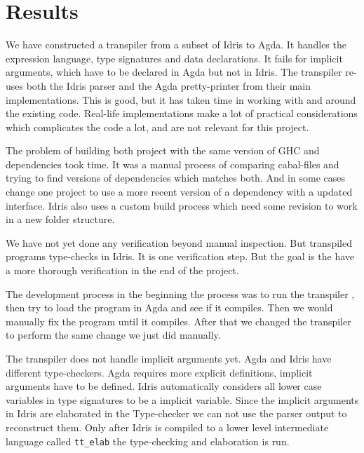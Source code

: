 \documentclass[parskip=half]{scrartcl}
\begin{document}
\section{Results}

We have constructed a transpiler from a subset of Idris to Agda. It handles the
expression language, type signatures and data declarations.  It fails for
implicit arguments, which have to be declared in Agda but not in Idris. The
transpiler re-uses both the Idris parser and the Agda pretty-printer from their
main implementations.  This is good, but it has taken time in working with and
around the existing code.  Real-life implementations make a lot of practical
considerations which complicates the code a lot, and are not relevant for this
project.


The problem of building both project with the same version of GHC and
dependencies took time. It was a manual process of comparing cabal-files and
trying to find versions of dependencies which matches both. And in some cases
change one project to use a more recent version of a dependency with a updated
interface. Idris also uses a custom build process which need some revision to
work in a new folder structure.



We have not yet done any verification beyond manual inspection.  But transpiled
programs type-checks in Idris. It is one verification step.  But the goal is
the have a more thorough verification in the end of the project.

The development process in the beginning the process was to run the transpiler , then try to load the program in Agda and see if it compiles.
Then we would manually fix the program until it compiles.
After that we changed the transpiler to perform the same change we just did
manually.


The transpiler does not handle implicit arguments yet.
Agda and Idris have different type-checkers.
Agda requires more explicit definitions, implicit arguments have to be defined.
Idris automatically considers all lower case variables in type signatures to be
a implicit variable.
Since the implicit arguments in Idris are elaborated in the Type-checker we can
not use the parser output to reconstruct them.
Only after Idris is compiled to a lower level intermediate
language called \texttt{tt\_elab} the type-checking and elaboration is run.
\end{document}
